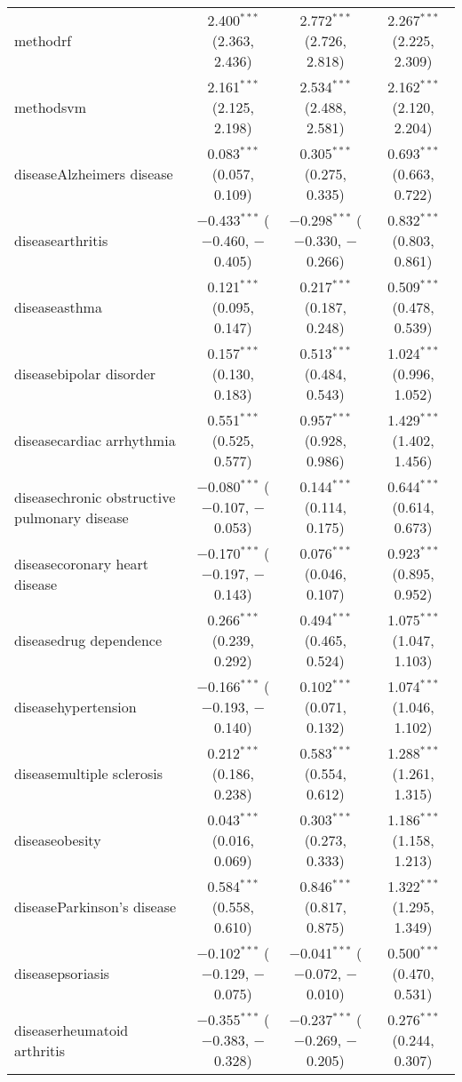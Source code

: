 \begin{table}[!htbp]
\begin{tabular}{@{\extracolsep{5pt}}lccc}
  methodrf & 2.400$^{***}$ (2.363, 2.436) & 2.772$^{***}$ (2.726, 2.818) & 2.267$^{***}$ (2.225, 2.309) \\ 
  methodsvm & 2.161$^{***}$ (2.125, 2.198) & 2.534$^{***}$ (2.488, 2.581) & 2.162$^{***}$ (2.120, 2.204) \\ 
  diseaseAlzheimers disease & 0.083$^{***}$ (0.057, 0.109) & 0.305$^{***}$ (0.275, 0.335) & 0.693$^{***}$ (0.663, 0.722) \\ 
  diseasearthritis & $-$0.433$^{***}$ ($-$0.460, $-$0.405) & $-$0.298$^{***}$ ($-$0.330, $-$0.266) & 0.832$^{***}$ (0.803, 0.861) \\ 
  diseaseasthma & 0.121$^{***}$ (0.095, 0.147) & 0.217$^{***}$ (0.187, 0.248) & 0.509$^{***}$ (0.478, 0.539) \\ 
  diseasebipolar disorder & 0.157$^{***}$ (0.130, 0.183) & 0.513$^{***}$ (0.484, 0.543) & 1.024$^{***}$ (0.996, 1.052) \\ 
  diseasecardiac arrhythmia & 0.551$^{***}$ (0.525, 0.577) & 0.957$^{***}$ (0.928, 0.986) & 1.429$^{***}$ (1.402, 1.456) \\ 
  diseasechronic obstructive pulmonary disease & $-$0.080$^{***}$ ($-$0.107, $-$0.053) & 0.144$^{***}$ (0.114, 0.175) & 0.644$^{***}$ (0.614, 0.673) \\ 
  diseasecoronary heart disease & $-$0.170$^{***}$ ($-$0.197, $-$0.143) & 0.076$^{***}$ (0.046, 0.107) & 0.923$^{***}$ (0.895, 0.952) \\ 
  diseasedrug dependence & 0.266$^{***}$ (0.239, 0.292) & 0.494$^{***}$ (0.465, 0.524) & 1.075$^{***}$ (1.047, 1.103) \\ 
  diseasehypertension & $-$0.166$^{***}$ ($-$0.193, $-$0.140) & 0.102$^{***}$ (0.071, 0.132) & 1.074$^{***}$ (1.046, 1.102) \\ 
  diseasemultiple sclerosis & 0.212$^{***}$ (0.186, 0.238) & 0.583$^{***}$ (0.554, 0.612) & 1.288$^{***}$ (1.261, 1.315) \\ 
  diseaseobesity & 0.043$^{***}$ (0.016, 0.069) & 0.303$^{***}$ (0.273, 0.333) & 1.186$^{***}$ (1.158, 1.213) \\ 
  diseaseParkinson's disease & 0.584$^{***}$ (0.558, 0.610) & 0.846$^{***}$ (0.817, 0.875) & 1.322$^{***}$ (1.295, 1.349) \\ 
  diseasepsoriasis & $-$0.102$^{***}$ ($-$0.129, $-$0.075) & $-$0.041$^{***}$ ($-$0.072, $-$0.010) & 0.500$^{***}$ (0.470, 0.531) \\ 
  diseaserheumatoid arthritis & $-$0.355$^{***}$ ($-$0.383, $-$0.328) & $-$0.237$^{***}$ ($-$0.269, $-$0.205) & 0.276$^{***}$ (0.244, 0.307) \\ 

\end{tabular}
\end{table}
